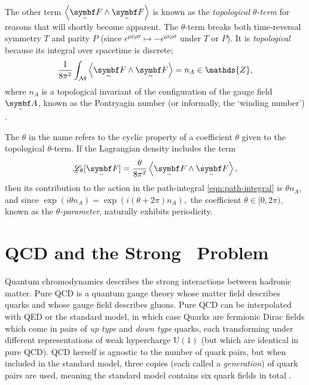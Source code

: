 The other term $\ang{\tsbm F \wedge \tsbm F}$ is known as the \emph{topological $\theta$-term} for reasons that will shortly become apparent.
The $\theta$-term breaks both time-reversal symmetry $T$ and parity $P$ (since $\epsilon^{\mu\nu\rho\sigma} \mapsto -\epsilon^{\mu\nu\rho\sigma}$ under $T$ or $P$).
It is \emph{topological} because its integral over spacetime is discrete;
\begin{align}
	\frac{1}{8\pi^2}\int_{\cal M} \ang{\tsbm F \wedge \tsbm F} = n_A \in \mathds{Z}
,\end{align}
where $n_A$ is a topological invariant of the configuration of the gauge field $\tsbm A$, known as the Pontryagin number (or informally, the `winding number') \cite[§\,2.2]{Tong_lecture_notes}.



The $\theta$ in the name refers to the cyclic property of a coefficient $\theta$ given to the topological $\theta$-term.
If the Lagrangian density includes the term
\begin{align}
	\LL_\theta[\tsbm F] = \frac{\theta}{8\pi^2}\ang{\tsbm F\wedge\tsbm F}
,\end{align}
then its contribution to the action in the path-integral \eqref{eqn:path-integral} is $\theta n_A$, and since
\begin{math}
	\exp(i\theta n_A) = \exp(i(\theta + 2\pi)n_A)
,\end{math}
the coefficient $\theta \in [0, 2\pi)$, known as the \emph{$\theta$-parameter}, naturally exhibits periodicity.




\section{QCD and the Strong \CP\ Problem}

Quantum chromodynamics describes the strong interactions between hadronic matter.
Pure QCD is a quantum gauge theory whose matter field describes quarks and whose gauge field describes gluons.
Pure QCD can be interpolated with QED or the standard model, in which case 
Quarks are fermionic Dirac fields which come in pairs of \emph{up type} and \emph{down type} quarks, each transforming under different representations of weak hypercharge $\mathrm{U}(1)$ (but which are identical in pure QCD).
QCD herself is agnostic to the number of quark pairs, but when included in the standard model, three copies (each called a \emph{generation}) of quark pairs are used, meaning the standard model contains six quark fields in total . 

